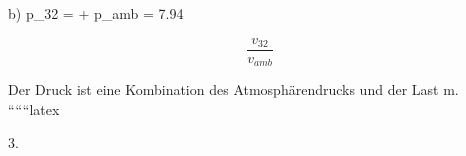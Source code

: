 b) \quad p_{32} =  + p_{amb} = 7.94 \, 

\begin{equation*}
\frac{v_{32}}{v_{amb}}
\end{equation*}

Der Druck ist eine Kombination des Atmosphärendrucks und der Last m.
``````latex


3.